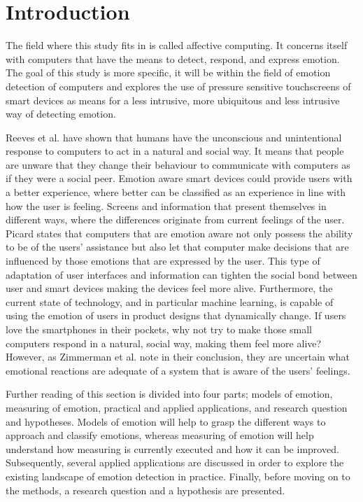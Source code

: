 \documentclass{sigchi}
\begin{document}
\section{Introduction} %
\label{sec:introduction}
The field where this study fits in is called affective computing. It concerns itself with computers that have the means to detect, respond, and express emotion. The goal of this study is more specific, it will be within the field of emotion detection of computers and explores the use of pressure sensitive touchscreens of smart devices as means for a less intrusive, more ubiquitous and less intrusive way of detecting emotion.

Reeves et al. \cite{Reeves1998} have shown that humans have the unconscious and unintentional response to computers to act in a natural and social way. It means that people are unware that they change their behaviour to communicate with computers as if they were a social peer. Emotion aware smart devices could provide users with a better experience, where better can be classified as an experience in line with how the user is feeling. Screens and information that present themselves in different ways, where the differences originate from current feelings of the user. Picard \cite{Picard1995} states that computers that are emotion aware not only possess the ability to be of the users' assistance but also let that computer make decisions that are influenced by those emotions that are expressed by the user. This type of adaptation of user interfaces and information can tighten the social bond between user and smart devices making the devices feel more alive. Furthermore, the current state of technology, and in particular machine learning, is capable of using the emotion of users in product designs that dynamically change. If users love the smartphones in their pockets, why not try to make those small computers respond in a natural, social way, making them feel more alive? However, as Zimmerman et al. \cite{Zimmermann2003} note in their conclusion, they are uncertain what emotional reactions are adequate of a system that is aware of the users' feelings. 

Further reading of this section is divided into four parts; models of emotion, measuring of emotion, practical and applied applications, and research question and hypotheses. Models of emotion will help to grasp the different ways to approach and classify emotions, whereas measuring of emotion will help understand how measuring is currently executed and how it can be improved. Subsequently, several applied applications are discussed in order to explore the existing landscape of emotion detection in practice. Finally, before moving on to the methods, a research question and a hypothesis are presented.
\end{document}
